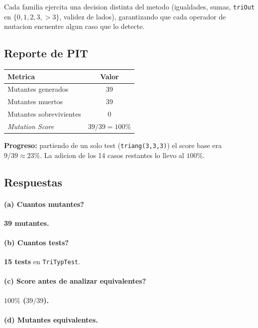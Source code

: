 \documentclass[12pt,a4paper]{article}
\begin{document}
Cada familia ejercita una decision distinta del metodo (igualdades, sumas, \texttt{triOut} en
$\{0,1,2,3,>3\}$, validez de lados), garantizando que cada operador de mutacion encuentre algun
caso que lo detecte.

\subsection{Reporte de PIT}

\begin{center}
\begin{tabular}{lc}
\toprule
Metrica & Valor \\
\midrule
Mutantes generados & 39 \\
Mutantes muertos   & 39 \\
Mutantes sobrevivientes & 0 \\
\emph{Mutation Score} & $39/39 = 100\%$ \\
\bottomrule
\end{tabular}
\end{center}

\textbf{Progreso:} partiendo de un solo test (\texttt{triang(3,3,3)}) el score base era
$9/39 \approx 23\%$. La adicion de los 14 casos restantes lo llevo al $100\%$.

\subsection{Respuestas}

\paragraph{(a) \textquestiondown{}Cuantos mutantes?} \textbf{39 mutantes.}

\paragraph{(b) \textquestiondown{}Cuantos tests?} \textbf{15 tests} en \texttt{TriTypTest}.

\paragraph{(c) \textquestiondown{}Score antes de analizar equivalentes?} \textbf{$100\%$
($39/39$).}

\paragraph{(d) Mutantes equivalentes.}
\end{document}
